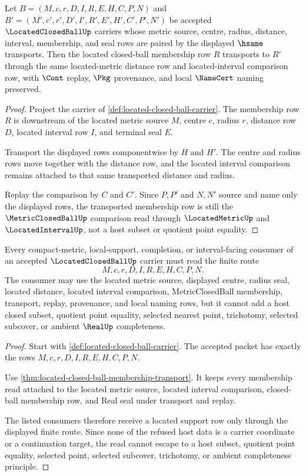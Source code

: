 \begin{theorem}
\label{thm:located-closed-ball-membership-transport}
Let $B=(M,c,r,D,I,R,E,H,C,P,N)$ and $B'=(M',c',r',D',I',R',E',H',C',P',N')$ be accepted $\LocatedClosedBallUp$ carriers whose metric source, centre, radius, distance, interval, membership, and seal rows are paired by the displayed $\hsame$ transports. Then the located closed-ball membership row $R$ transports to $R'$ through the same located-metric distance row and located-interval comparison row, with $\Cont$ replay, $\Pkg$ provenance, and local $\NameCert$ naming preserved.
\end{theorem}
\begin{proof}
Project the carrier of \autoref{def:located-closed-ball-carrier}. The membership row $R$ is downstream of the located metric source $M$, centre $c$, radius $r$, distance row $D$, located interval row $I$, and terminal seal $E$.

Transport the displayed rows componentwise by $H$ and $H'$. The centre and radius rows move together with the distance row, and the located interval comparison remains attached to that same transported distance and radius.

Replay the comparison by $C$ and $C'$. Since $P,P'$ and $N,N'$ source and name only the displayed rows, the transported membership row is still the $\MetricClosedBallUp$ comparison read through $\LocatedMetricUp$ and $\LocatedIntervalUp$, not a host subset or quotient point equality.
\end{proof}

\begin{theorem}
\label{thm:located-closed-ball-nonescape}
Every compact-metric, local-support, completion, or interval-facing consumer of an accepted $\LocatedClosedBallUp$ carrier must read the finite route
$$
M,c,r,D,I,R,E,H,C,P,N .
$$
The consumer may use the located metric source, displayed centre, radius seal, located distance, located interval comparison, MetricClosedBall membership, transport, replay, provenance, and local naming rows, but it cannot add a host closed subset, quotient point equality, selected nearest point, trichotomy, selected subcover, or ambient $\RealUp$ completeness.
\end{theorem}
\begin{proof}
Start with \autoref{def:located-closed-ball-carrier}. The accepted packet has exactly the rows $M,c,r,D,I,R,E,H,C,P,N$.

Use \autoref{thm:located-closed-ball-membership-transport}. It keeps every membership read attached to the located metric source, located interval comparison, closed-ball membership row, and Real seal under transport and replay.

The listed consumers therefore receive a located support row only through the displayed finite route. Since none of the refused host data is a carrier coordinate or a continuation target, the read cannot escape to a host subset, quotient point equality, selected point, selected subcover, trichotomy, or ambient completeness principle.
\end{proof}

